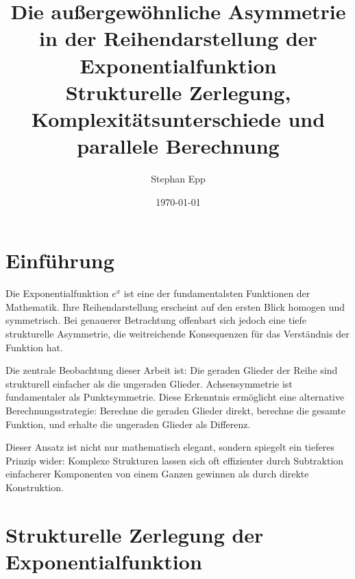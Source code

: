 ﻿\documentclass[a4paper,12pt]{article}
\title{Die au\ss ergewöhnliche Asymmetrie in der Reihendarstellung der
       Exponentialfunktion \\[0.5ex]
       \large Strukturelle Zerlegung, Komplexitätsunterschiede und
       parallele Berechnung}
\author{Stephan Epp}
\date{\today}
\theoremstyle{definition}
\begin{document}
\maketitle
\tableofcontents
\newpage

\section{Einführung}

Die Exponentialfunktion $e^x$ ist eine der fundamentalsten Funktionen der
Mathematik. Ihre Reihendarstellung erscheint auf den ersten Blick homogen und
symmetrisch. Bei genauerer Betrachtung offenbart sich jedoch eine tiefe
strukturelle Asymmetrie, die weitreichende Konsequenzen für das Verständnis der
Funktion hat.

Die zentrale Beobachtung dieser Arbeit ist: Die geraden Glieder der Reihe sind
strukturell einfacher als die ungeraden Glieder. Achsensymmetrie ist
fundamentaler als Punktsymmetrie. Diese Erkenntnis ermöglicht eine alternative
Berechnungsstrategie: Berechne die geraden Glieder direkt, berechne die gesamte
Funktion, und erhalte die ungeraden Glieder als Differenz.

Dieser Ansatz ist nicht nur mathematisch elegant, sondern spiegelt ein tieferes
Prinzip wider: Komplexe Strukturen lassen sich oft effizienter durch Subtraktion
einfacherer Komponenten von einem Ganzen gewinnen als durch direkte Konstruktion.

\section{Strukturelle Zerlegung der Exponentialfunktion}
\end{document}
